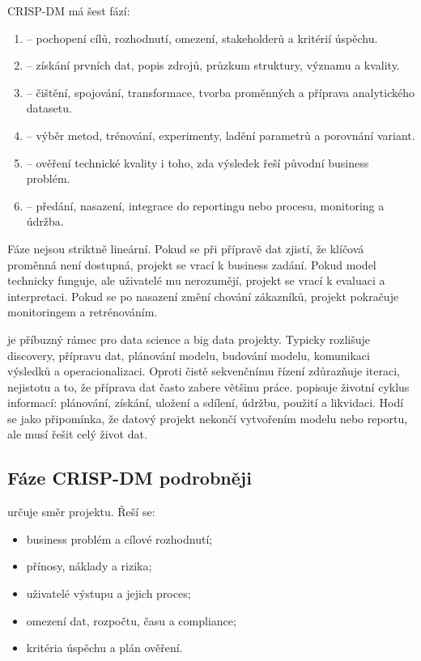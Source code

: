CRISP-DM má šest fází:
\begin{enumerate}
  \item {} -- pochopení cílů, rozhodnutí, omezení, stakeholderů a kritérií úspěchu.
  \item {} -- získání prvních dat, popis zdrojů, průzkum struktury, významu a kvality.
  \item {} -- čištění, spojování, transformace, tvorba proměnných a příprava analytického datasetu.
  \item {} -- výběr metod, trénování, experimenty, ladění parametrů a porovnání variant.
  \item {} -- ověření technické kvality i toho, zda výsledek řeší původní business problém.
  \item {} -- předání, nasazení, integrace do reportingu nebo procesu, monitoring a údržba.
\end{enumerate}

Fáze nejsou striktně lineární. Pokud se při přípravě dat zjistí, že klíčová proměnná není dostupná, projekt se vrací k business zadání. Pokud model technicky funguje, ale uživatelé mu nerozumějí, projekt se vrací k evaluaci a interpretaci. Pokud se po nasazení změní chování zákazníků, projekt pokračuje monitoringem a retrénováním.

 je příbuzný rámec pro data science a big data projekty. Typicky
rozlišuje discovery, přípravu dat, plánování modelu, budování modelu, komunikaci výsledků a
operacionalizaci. Oproti čistě sekvenčnímu řízení zdůrazňuje iteraci, nejistotu a to, že příprava dat
často zabere většinu práce.  popisuje životní cyklus informací: plánování, získání,
uložení a sdílení, údržbu, použití a likvidaci. Hodí se jako připomínka, že datový projekt nekončí
vytvořením modelu nebo reportu, ale musí řešit celý život dat.

\subsection{Fáze CRISP-DM podrobněji}
 určuje směr projektu. Řeší se:
\begin{itemize}
  \item business problém a cílové rozhodnutí;
  \item přínosy, náklady a rizika;
  \item uživatelé výstupu a jejich proces;
  \item omezení dat, rozpočtu, času a compliance;
  \item kritéria úspěchu a plán ověření.
\end{itemize}

